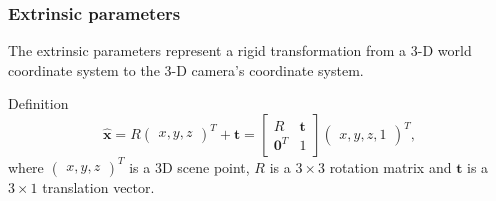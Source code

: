 \documentclass{beamer}
\begin{document}
\begin{frame}
	\frametitle{Extrinsic parameters}
	The extrinsic parameters represent a rigid transformation from a 3-D world
	coordinate system to the 3-D camera’s coordinate system.

	\begin{exampleblock}{Definition}
		\begin{equation*}
			\widehat{\mathbf{x}} =
			R \begin{pmatrix}
				x, y, z
			\end{pmatrix}^{T} + \mathbf{t} =
			\begin{bmatrix}
				R              & \mathbf{t} \\
				\mathbf{0}^{T} & 1
			\end{bmatrix} \begin{pmatrix}
				x, y, z, 1
			\end{pmatrix}^{T},
		\end{equation*}
		where
		\(\begin{pmatrix}
			x, y, z
		\end{pmatrix}^{T}\) is a 3D scene point,
		\(R\) is a \(3 \times 3\) rotation matrix
		and \(\mathbf{t}\) is
		a \(3 \times 1\) translation vector.
	\end{exampleblock}
\end{frame}
\end{document}
